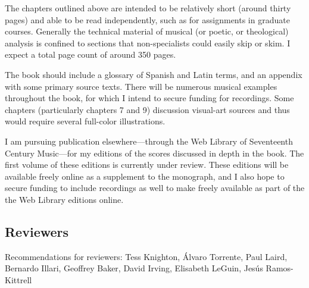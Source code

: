 \documentclass[tt]{vcbook-proposal}
\begin{document}
The chapters outlined above are intended to be relatively short (around thirty pages) and able to be read independently, such as for assignments in graduate courses.
Generally the technical material of musical (or poetic, or theological) analysis is confined to sections that non-specialists could easily skip or skim.
I expect a total page count of around 350 pages.

The book should include a glossary of Spanish and Latin terms, and an appendix with some primary source texts.
There will be numerous musical examples throughout the book, for which I intend to secure funding for recordings.
Some chapters (particularly chapters 7 and 9) discussion visual-art sources and thus would require several full-color illustrations.

I am pursuing publication elsewhere---through the Web Library of Seventeenth Century Music---for my editions of the scores discussed in depth in the book. 
The first volume of these editions is currently under review.
These editions will be available freely online as a supplement to the monograph, and I also hope to secure funding to include recordings as well to make freely available as part of the the Web Library editions online.

\subsection{Reviewers}

Recommendations for reviewers: Tess Knighton, Álvaro Torrente, Paul Laird, Bernardo Illari, Geoffrey Baker, David Irving, Elisabeth LeGuin, Jesús Ramos-Kittrell

\printbibliography
\end{document}

